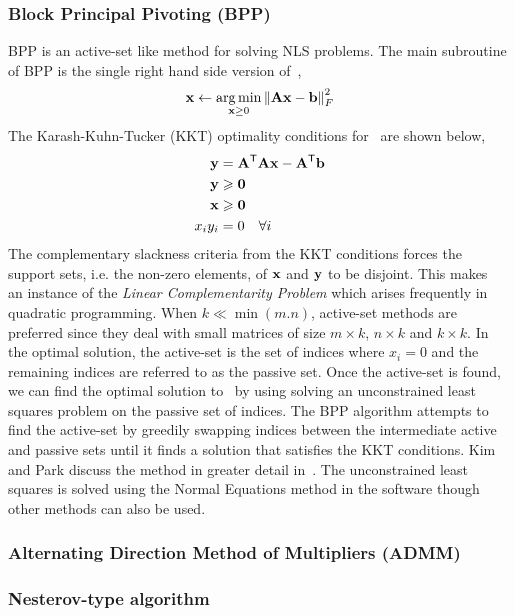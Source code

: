 \subsubsection{Block Principal Pivoting (BPP)}
BPP is an active-set like method for solving NLS problems. The main subroutine of BPP is the single right hand side version of~,
\begin{align}
\V{x} \leftarrow \underset{\V{x} \ge 0}{\argmin} \left\lVert \M{A}\V{x} -\V{b}\right\rVert^2_F
\label{eqn:snls}
\end{align}
The Karash-Kuhn-Tucker (KKT) optimality conditions for~ are shown below,
\begin{subequations}
\begin{align}
\V{y} &= \M{A}^\Tra\M{A}\V{x} - \M{A}^\Tra\V{b} \\
\V{y} &\geq \V{0} \\
\V{x} &\geq \V{0} \\
x_i y_i &= 0 \quad \forall i
\end{align}
\label{eqn:bppkkt}
\end{subequations}
The complementary slackness criteria from the KKT conditions forces the support sets, i.e. the non-zero elements, of $\V{x}$ and $\V{y}$ to be disjoint. This makes~ an instance of the \emph{Linear Complementarity Problem} which arises frequently in quadratic programming. When $k \ll \min(m.n)$, active-set methods are preferred since they deal with small matrices of size $m \times k$, $n \times k$ and $k \times k$. In the optimal solution, the active-set is the set of indices where $x_i = 0$ and the remaining indices are referred to as the passive set. Once the active-set is found, we can find the optimal solution to~ by using solving an unconstrained least squares problem on the passive set of indices. The BPP algorithm attempts to find the active-set by greedily swapping indices between the intermediate active and passive sets until it finds a solution that satisfies the KKT conditions. Kim and Park discuss the method in greater detail in~\cite{KP2011}. The unconstrained least squares is solved using the Normal Equations method in the software though other methods can also be used.

\subsubsection{Alternating Direction Method of Multipliers (ADMM)}

\subsubsection{Nesterov-type algorithm}
